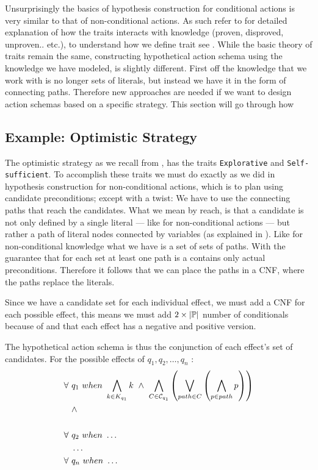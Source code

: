 \documentclass[\master/Master.tex]{subfiles}
\begin{document}
  	Unsurprisingly the basics of hypothesis construction for conditional actions is very similar to that of non-conditional actions. 
  	As such refer to  for detailed explanation of how the traits interacts with knowledge (proven, disproved, unproven.. etc.), to understand how we define trait see .
  	While the basic theory of traits remain the same, constructing hypothetical action schema using the knowledge we have modeled, is slightly different. First off the knowledge that we work with is no longer sets of literals, but instead we have it in the form of connecting paths.
  	Therefore new approaches are needed if we want to design action schemas based on a specific strategy.
  	This section will go through how 
  	 	
  	\subsection{Example: Optimistic Strategy}
  	The optimistic strategy as we recall from , has the traits \texttt{Explorative} and \texttt{Self-sufficient}.
  	To accomplish these traits we must do exactly as we did in hypothesis construction for non-conditional actions, 
  	which is to plan using candidate preconditions; except with a twist: 
  	We have to use the connecting paths that reach the candidates.
  	What we mean by reach, is that a candidate is not only defined by a single literal --- like for non-conditional actions --- but rather a path of literal nodes connected by variables (as explained in ). 
  	Like for non-conditional knowledge what we have is a set of sets of paths. With the guarantee that for each set at least one path is a contains only actual preconditions. Therefore it follows that we can place the paths in a CNF, where the paths replace the literals.
  	
  	Since we have a candidate set \cset for each individual effect, we must add a CNF for each possible effect,
  	this means we must add $2 \times |\mathbb{P}|$ number of conditionals because of  and that each effect has a negative and positive version.
  	
  	The hypothetical action schema is thus the conjunction of each effect's set of candidates.
  	For the possible effects of $q_1,q_2,\dots,q_n$ :  	
  	\begin{equation} \label{eq:ca:opt-preconds}
  	\begin{split}  	
  	\forall ~& q_1 ~ when ~ \bigwedge\limits_{k \in K_{q_1}} k ~ \land ~ 
  	\bigwedge \limits_{C \in \mathcal{C}_{q_1} } \left( \bigvee \limits_{path \in C} \left( \bigwedge \limits_{p \in path} p\right)\right)
  	\\
  	& \land \\
  	\\
  	\forall ~& q_2 ~ when ~  \dots \\
  	&\dots \\
  	\forall ~& q_n ~ when ~  \dots
  	\end{split}  	
  	\end{equation}
  	
\end{document}
